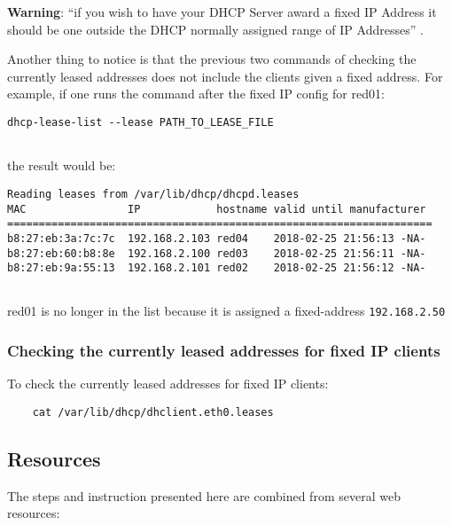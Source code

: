 \textbf{Warning}: ``if you wish to have your DHCP Server award a fixed
IP Address it should be one outside the DHCP normally assigned range of
IP Addresses'' \cite{hid-sp18-405-tutorial-pidhcp-pdf}.

Another thing to notice is that the previous two commands of checking
the currently leased addresses does not include the clients given a
fixed address. For example, if one runs the command after the fixed IP
config for red01:

\begin{lstlisting}
dhcp-lease-list --lease PATH_TO_LEASE_FILE
    
\end{lstlisting}

the result would be:

\begin{lstlisting}
Reading leases from /var/lib/dhcp/dhcpd.leases
MAC                IP            hostname valid until manufacturer
===================================================================
b8:27:eb:3a:7c:7c  192.168.2.103 red04    2018-02-25 21:56:13 -NA-
b8:27:eb:60:b8:8e  192.168.2.100 red03    2018-02-25 21:56:11 -NA-
b8:27:eb:9a:55:13  192.168.2.101 red02    2018-02-25 21:56:12 -NA-
    
\end{lstlisting}

red01 is no longer in the list because it is assigned a fixed-address
\texttt{192.168.2.50}

\subsubsection{Checking the currently leased addresses for fixed IP clients}

To check the currently leased addresses for fixed IP clients:

\begin{lstlisting}
    cat /var/lib/dhcp/dhclient.eth0.leases
\end{lstlisting}

\subsection{Resources}

The steps and instruction presented here are combined from several web
resources:

